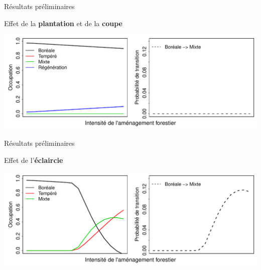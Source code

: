 \documentclass[11pt, compress, aspectratio=1610]{beamer}
\begin{document}
\begin{frame}{Résultats préliminaires}

Effet de la \textbf{plantation} et de la \textbf{coupe}

\centering
 \includegraphics[scale=0.65]{figures/result0.pdf}\par

\end{frame}

\begin{frame}{Résultats préliminaires}

Effet de l'\textbf{éclaircie}

\centering
 \includegraphics[scale=0.65]{figures/result1.pdf}\par

\end{frame}
\end{document}
